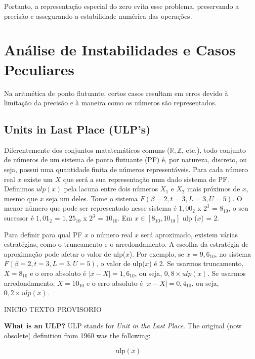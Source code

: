 Portanto, a representação especial do zero evita esse problema, preservando a precisão e assegurando a estabilidade numérica das operações.

\section{Análise de Instabilidades e Casos Peculiares}

Na aritmética de ponto flutuante, certos casos resultam em erros devido à limitação da precisão e à maneira como os números são representados. 

\subsection{Units in Last Place (ULP's)} 
Diferentemente dos conjuntos matatemáticos comuns ($\mathbb{R}, \mathbb{Z}$, etc.), todo conjunto de números de um sistema de ponto flutuante (PF) é, por natureza, discreto, ou seja, possui uma quantidade finita de números representáveis. Para cada número real $x$ existe um $X$ que será a sua representação num dado sistema de PF. Definimos $ulp(x)$ pela lacuna entre dois números $X_{1}$ e $X_{2}$ mais próximos de $x$, mesmo que $x$ seja um deles.
Tome o sistema $F(\beta = 2, t = 3, L = 3 , U = 5)$. O menor número que pode ser representado nesse sistema é $1{,}00_{2}$ x $2^{3}$ = $8_{10}$, o seu sucessor é $1{,}01_{2}$ = $1{,}25_{10}$ x $2^{3}$ = $10_{10}$.
Em $x \in [8_{10} , 10_{10}]$ ulp ($x$) = 2.

Para definir para qual PF $x$ o número real $x$ será aproximado, existem várias estratégias, como o truncamento e o arredondamento. A escolha da estratégia de aproximação pode afetar o valor de ulp($x$). Por exemplo, se $x = 9{,}6_{10}$, no sistema $F(\beta = 2, t = 3, L = 3 , U = 5)$, o valor de ulp($x$) é 2. Se usarmos truncamento, $X = 8_{10}$ e o erro absoluto é $|x - X| = 1{,}6_{10}$, ou seja, $0{,}8 \times ulp(x)$. Se usarmos arredondamento, $X = 10_{10}$ e o erro absoluto é $|x - X| = 0{,}4_{10}$, ou seja, $0{,}2 \times ulp(x)$.


INICIO TEXTO PROVISORIO


\textbf{What is an ULP?} ULP stands for \textit{Unit in the Last Place}. 
The original (now obsolete) definition from 1960 was the following:

\begin{equation}
\mathrm{ulp}(x)
\end{equation}

